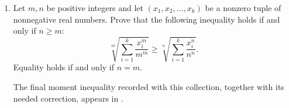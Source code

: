 \documentclass[11pt,a4paper]{article}
\begin{document}
\begin{enumerate}[label=\textbf{\arabic*.},itemsep=.75em]
\item Let $m,n$ be positive integers and let $(x_1,x_2,\ldots,x_k)$ be a
nonzero tuple of nonnegative real numbers. Prove that the following inequality
holds if and only if $n\geq m$:
\[
\sqrt[m]{\sum_{i=1}^k\frac{x_i^m}{m^m}}
\geq\sqrt[n]{\sum_{i=1}^k\frac{x_i^n}{n^n}}.
\]
Equality holds if and only if $n=m$.

The final moment inequality recorded with this collection, together with its
needed correction, appears in
.

\end{enumerate}
\end{document}
